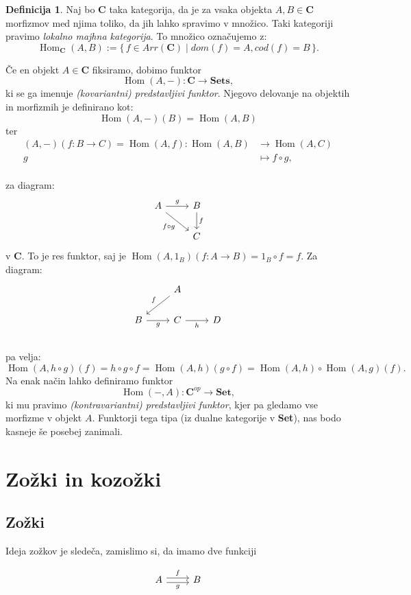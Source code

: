 \documentclass[12pt,a4paper]{book}
\theoremstyle{definition}
\newtheorem{definicija}{Definicija}[chapter]
\theoremstyle{plain}
\theoremstyle{definition}
\theoremstyle{remark}
\newcommand{\cat}[1]{\textbf{#1}}
\DeclareMathOperator{\Hom}{Hom}
\renewcommand{\set}[1]{\{\,#1\,\}}
\begin{document}
\begin{definicija}

Naj bo $\cat{C}$ taka kategorija, da je za vsaka objekta $A,B \in \cat{C}$ morfizmov med njima toliko, da jih lahko spravimo v množico. Taki kategoriji pravimo \emph{lokalno majhna kategorija}. To množico označujemo z:
$$\Hom_{\cat{C}}(A,B) := \set{f \in Arr(\cat{C}) \mid dom(f) = A, cod(f) = B}.$$
\end{definicija}
Če en objekt $A \in \cat{C}$ fiksiramo, dobimo funktor
$$\Hom(A,-) : \cat{C} \to \cat{Sets},$$
ki se ga imenuje \emph{(kovariantni) predstavljivi funktor}. Njegovo delovanje na objektih in morfizmih je definirano kot:
$$\Hom(A,-)(B) = \Hom(A,B)$$
ter
\begin{align*}
(A,-)(f : B \to C) = \Hom(A,f): \Hom(A,B) &\to \Hom(A,C) \\
g &\mapsto f \circ g, \\
\end{align*}

za diagram:
$$ \begin{tikzcd}
A \ar[r, "g"] \ar[rd, "f \circ g"'] & B \ar[d, "f"] \\
& C
\end{tikzcd} $$
v $\cat{C}$.
To je res funktor, saj je $\Hom(A,1_B)(f:A \to B) = 1_B \circ f = f$. Za diagram: 
$$ \begin{tikzcd}
& A \ar[dl, "f"'] & \\
B \ar[r, "g"'] & C \ar[r, "h"'] & D \\
\end{tikzcd} $$
pa velja:
$$
\Hom(A,h \circ g)(f) = h \circ g \circ f = \Hom(A,h)(g \circ f) = \Hom(A,h) \circ \Hom(A,g)(f).
$$
Na enak način lahko definiramo funktor
$$\Hom(-,A) : \cat{C}^{op} \to \cat{Set},$$
ki mu pravimo \emph{(kontravariantni) predstavljivi funktor},
kjer pa gledamo vse morfizme v objekt $A$. Funktorji tega tipa (iz dualne kategorije v \cat{Set}), nas bodo kasneje še posebej zanimali.

\section{Zožki in kozožki}

\subsection{Zožki}
Ideja zožkov je sledeča, zamislimo si, da imamo dve funkciji

$$\begin{tikzcd}
A \ar[r, shift left, "f"] \ar[r, shift right, "g"'] & B 
\end{tikzcd}$$
\end{document}

